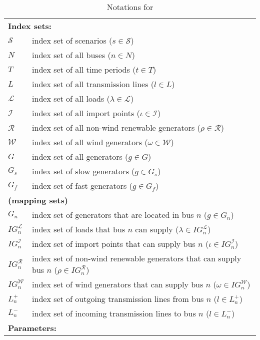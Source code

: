 \begin{table}[H]
	\centering
	\caption{Notations for \suc}
	\label{SUC:notation}
	\resizebox{\textwidth}{!}
	{
		\begin{tabular}{ll}
			\toprule
			\multicolumn{2}{l}{\textbf{Index sets:}} \\
			$\mathcal{S}$ & index set of scenarios ($s\in\mathcal{S}$) 		\\ 		
			$N$ & index set of all buses ($n\in N$)\\
			$T$ & index set of all time periods ($t\in T$)\\
			$L$ & index set of all transmission lines ($l\in L$) \\
			$\mathcal{L}$ & index set of all loads ($\lambda \in \mathcal{L}$)\\
			$\mathcal{I}$ & index set of all import points ($\iota\in \mathcal{I}$)\\
			$\mathcal{R}$ & index set of all non-wind renewable generators ($\rho\in \mathcal{R}$)\\
			$\mathcal{W}$ & index set of all wind generators ($\omega\in \mathcal{W}$)\\
			$G$ & index set of all generators ($g\in G$)\\
			$G_s$ & index set of slow generators ($g\in G_s$)\\
			$G_f$ & index set of fast generators ($g\in G_f$)\\
			\multicolumn{2}{l}{\textbf{(mapping sets)}} \\
			$G_n$ & index set of generators that are located in bus $n$ ($g\in G_n$)\\
			$IG_n^\mathcal{L}$ & index set of loads that bus $n$ can supply ($\lambda\in IG_n^\mathcal{L}$)\\
			$IG_n^\mathcal{I}$ & index set of import points that can supply bus $n$ ($\iota\in IG_n^\mathcal{I}$) \\
			$IG_n^\mathcal{R}$ & index set of non-wind renewable generators that can supply bus $n$ ($\rho\in IG_n^\mathcal{R}$) \\
			$IG_n^\mathcal{W}$ & index set of wind generators that can supply bus $n$ ($\omega\in IG_n^\mathcal{W}$)\\
			$L_n^{+}$ & index set of outgoing transmission lines from bus $n$ ($l\in L_n^+$)\\
			$L_n^{-}$ & index set of incoming transmission lines to bus $n$ ($l\in L_n^-$)\\ \midrule
			\multicolumn{2}{l}{\textbf{Parameters:}} \\

\end{tabular}}
\end{table}
